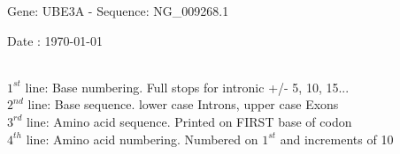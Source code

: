 \documentclass{article}
\begin{document}
\renewcommand{\footrulewidth}{1pt}
\renewcommand{\headrulewidth}{0pt}
\begin{center}
\begin{large}
 Gene: UBE3A - Sequence: NG\_009268.1
 
 Date : \today\\\\
\end{large}
\end{center}
$1^{st}$ line: Base numbering. Full stops for intronic +/- 5, 10, 15...\\
$2^{nd}$ line: Base sequence. lower case Introns, upper case Exons\\
$3^{rd}$ line: Amino acid sequence. Printed on FIRST base of codon\\
$4^{th}$ line: Amino acid numbering. Numbered on $1^{st}$ and increments of 10\\
\end{document}

